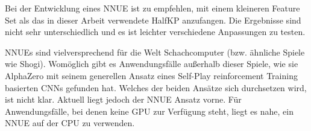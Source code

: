 Bei der Entwicklung eines \ac{NNUE} ist zu empfehlen, mit einem kleineren Feature Set als das in dieser Arbeit verwendete HalfKP anzufangen. Die Ergebnisse sind nicht sehr unterschiedlich und es ist leichter verschiedene Anpassungen zu testen.

\acp{NNUE} sind vielversprechend für die Welt Schachcomputer (bzw. ähnliche Spiele wie Shogi). Womöglich gibt es Anwendungsfälle außerhalb dieser Spiele, wie sie AlphaZero mit seinem generellen Ansatz eines Self-Play reinforcement Training basierten \acp{CNN} gefunden hat. Welches der beiden Ansätze sich durchsetzen wird, ist nicht klar. Aktuell liegt jedoch der \ac{NNUE} Ansatz vorne. Für Anwendungsfälle, bei denen keine GPU zur Verfügung steht, liegt es nahe, ein \ac{NNUE} auf der CPU zu verwenden.